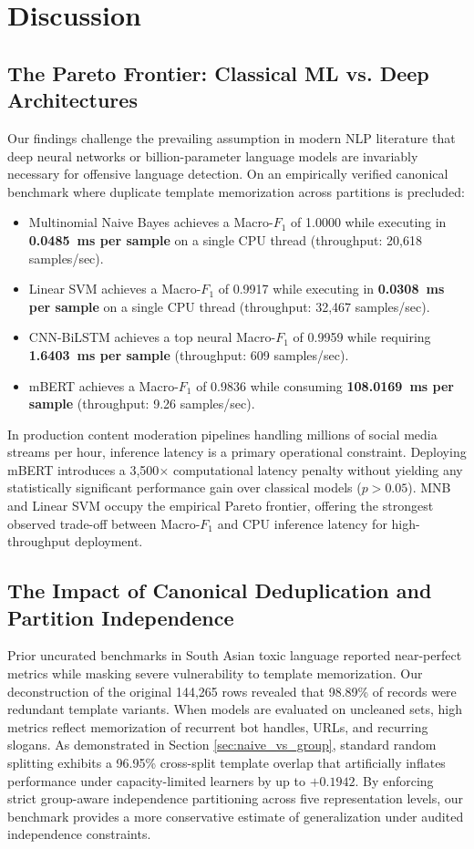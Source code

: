 \documentclass[11pt,a4paper]{article}
\begin{document}
\section{Discussion}\label{sec:discussion}

\subsection{The Pareto Frontier: Classical ML vs. Deep Architectures}
Our findings challenge the prevailing assumption in modern NLP literature that deep neural networks or billion-parameter language models are invariably necessary for offensive language detection. On an empirically verified canonical benchmark where duplicate template memorization across partitions is precluded:
\begin{itemize}
    \item Multinomial Naive Bayes achieves a Macro-$F_1$ of 1.0000 while executing in \textbf{0.0485~ms per sample} on a single CPU thread (throughput: 20,618 samples/sec).
    \item Linear SVM achieves a Macro-$F_1$ of 0.9917 while executing in \textbf{0.0308~ms per sample} on a single CPU thread (throughput: 32,467 samples/sec).
    \item CNN-BiLSTM achieves a top neural Macro-$F_1$ of 0.9959 while requiring \textbf{1.6403~ms per sample} (throughput: 609 samples/sec).
    \item mBERT achieves a Macro-$F_1$ of 0.9836 while consuming \textbf{108.0169~ms per sample} (throughput: 9.26 samples/sec).
\end{itemize}
In production content moderation pipelines handling millions of social media streams per hour, inference latency is a primary operational constraint. Deploying mBERT introduces a 3,500$\times$ computational latency penalty without yielding any statistically significant performance gain over classical models ($p > 0.05$). MNB and Linear SVM occupy the empirical Pareto frontier, offering the strongest observed trade-off between Macro-$F_1$ and CPU inference latency for high-throughput deployment.

\subsection{The Impact of Canonical Deduplication and Partition Independence}
Prior uncurated benchmarks in South Asian toxic language reported near-perfect metrics while masking severe vulnerability to template memorization. Our deconstruction of the original 144,265 rows revealed that 98.89\% of records were redundant template variants. When models are evaluated on uncleaned sets, high metrics reflect memorization of recurrent bot handles, URLs, and recurring slogans. As demonstrated in Section \ref{sec:naive_vs_group}, standard random splitting exhibits a 96.95\% cross-split template overlap that artificially inflates performance under capacity-limited learners by up to $+0.1942$. By enforcing strict group-aware independence partitioning across five representation levels, our benchmark provides a more conservative estimate of generalization under audited independence constraints.
\end{document}

